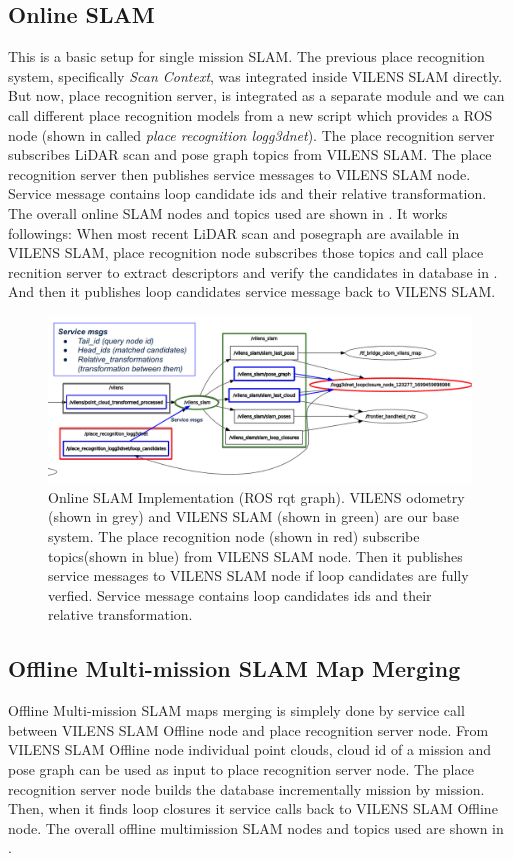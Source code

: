 \subsection{Online SLAM}
This is a basic setup for single mission SLAM. The previous place recognition system, specifically \emph{Scan Context}, was integrated inside VILENS SLAM directly. But now, place recognition server, is integrated as a separate module and we can call different place recognition models from a new script which provides a ROS node (shown in  called \emph{place recognition logg3dnet}). The place recognition server subscribes LiDAR scan and pose graph topics from VILENS SLAM. The place recognition server then publishes service messages to VILENS SLAM node. Service message contains loop candidate ids and their relative transformation. The overall online SLAM nodes and topics used are shown in . 
It works followings: When most recent LiDAR scan and posegraph are available in VILENS SLAM, place recognition node subscribes those topics and call place recnition server to extract descriptors and verify the candidates in database in . And then it publishes loop candidates service message back to VILENS SLAM. 

\begin{figure}[t]
  \centering
  \includegraphics[width=0.99\columnwidth]{pics/Implementation_Online_SLAM2.png}
  \caption{Online SLAM Implementation (ROS rqt graph). VILENS odometry (shown in grey) and VILENS SLAM (shown in green) are our base system. The place recognition node (shown in red) subscribe topics(shown in blue) from VILENS SLAM node. Then it publishes service messages to VILENS SLAM node if loop candidates are fully verfied. Service message contains loop candidates ids and their relative transformation.}
  \label{fig:implementation_online_slam}
\end{figure}


\subsection{Offline Multi-mission SLAM Map Merging}
Offline Multi-mission SLAM maps merging is simplely done by  service call between VILENS SLAM Offline node and place recognition server node. From VILENS SLAM Offline node individual point clouds, cloud id of a mission and pose graph can be used as input to place recognition server node. The place recognition server node builds the database incrementally mission by mission. Then, when it finds loop closures it service calls back to VILENS SLAM Offline node. The overall offline multimission SLAM nodes and topics used are shown in .  

